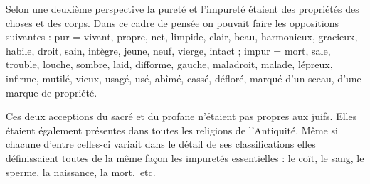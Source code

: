  Selon une deuxième perspective la pureté et l'impureté étaient des propriétés des choses et des corps. Dans ce cadre de pensée on pouvait faire les oppositions suivantes : pur = vivant, propre, net, limpide, clair, beau, harmonieux, gracieux, habile, droit, sain, intègre, jeune, neuf, vierge, intact ; impur = mort, sale, trouble, louche, sombre, laid, difforme, gauche, maladroit, malade, lépreux, infirme, mutilé, vieux, usagé, usé, abîmé, cassé, défloré, marqué d'un sceau, d'une marque de propriété.

 Ces deux acceptions du sacré et du profane n'étaient pas propres aux juifs. Elles étaient également présentes dans toutes les religions de l'Antiquité. Même si chacune d'entre celles-ci variait dans le détail de ses classifications elles définissaient toutes de la même façon les impuretés essentielles : le coït, le sang, le sperme, la naissance, la mort,~etc. 
 
